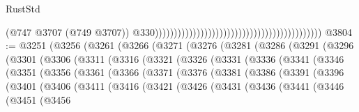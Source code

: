 \begin{lexlean}{RustStd}
\begin{coremodule}
                                                                                            (@747
                                                                                              @3707
                                                                                              (@749
                                                                                                @3707))
                                                                                            @330))))))))))))))))))))))))))))))))))))))))))))
@3804 := @3251
    (@3256
      (@3261
        (@3266
          (@3271
            (@3276
              (@3281
                (@3286
                  (@3291
                    (@3296
                      (@3301
                        (@3306
                          (@3311
                            (@3316
                              (@3321
                                (@3326
                                  (@3331
                                    (@3336
                                      (@3341
                                        (@3346
                                          (@3351
                                            (@3356
                                              (@3361
                                                (@3366
                                                  (@3371
                                                    (@3376
                                                      (@3381
                                                        (@3386
                                                          (@3391
                                                            (@3396
                                                              (@3401
                                                                (@3406
                                                                  (@3411
                                                                    (@3416
                                                                      (@3421
                                                                        (@3426
                                                                          (@3431
                                                                            (@3436
                                                                              (@3441
                                                                                (@3446
                                                                                  (@3451
                                                                                    (@3456

\end{coremodule}
\end{lexlean}
